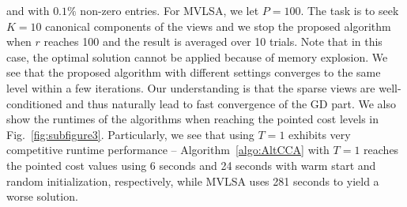 \documentclass[10pt,journal]{IEEEtran}
\begin{document}
and with $0.1\%$ non-zero entries.
For MVLSA, we let $P=100$.
The task is to seek $K=10$ canonical components of the views and we stop the proposed algorithm when $r$ reaches 100 and the result is averaged over 10 trials.
Note that in this case, the optimal solution cannot be applied because of memory explosion.
We see that the proposed algorithm with different settings converges to the same level within a few iterations. Our understanding is that the sparse views are well-conditioned and thus naturally lead to fast convergence of the GD part.
We also show the runtimes of the algorithms when reaching the pointed cost levels in Fig.~\ref{fig:subfigure3}. 
Particularly, we see that using $T=1$ exhibits very competitive runtime performance --
Algorithm~\ref{algo:AltCCA} with $T=1$ reaches the pointed cost values using 6 seconds and 24 seconds with warm start and random initialization, respectively, while MVLSA uses 281 seconds to yield a worse solution.





\end{document}
